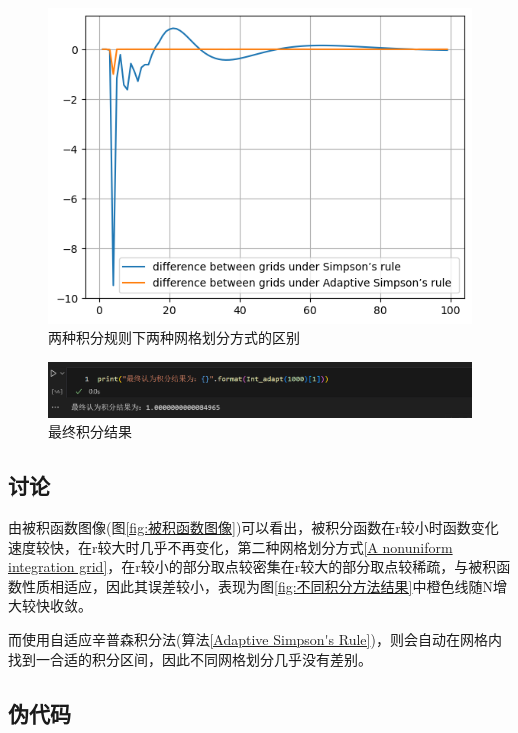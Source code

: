 \documentclass[11pt]{article}
\begin{document}
\begin{figure}[H]
    \centering
    \includegraphics[width=0.5\linewidth]{两种积分规则下两种网格划分方式的区别.png}
    \caption{两种积分规则下两种网格划分方式的区别}
    \label{fig:两种积分规则下两种网格划分方式的区别}
\end{figure}

\begin{figure}[H]
    \centering
    \includegraphics[width=0.5\linewidth]{最终积分结果.png}
    \caption{最终积分结果}
    \label{fig:最终积分结果}
\end{figure}

\subsection{讨论}
由被积函数图像(图\ref{fig:被积函数图像})可以看出，被积分函数在r较小时函数变化速度较快，在r较大时几乎不再变化，第二种网格划分方式\ref{A nonuniform integration grid}，在r较小的部分取点较密集在r较大的部分取点较稀疏，与被积函数性质相适应，因此其误差较小，表现为图\ref{fig:不同积分方法结果}中橙色线随N增大较快收敛。

而使用自适应辛普森积分法(算法\ref{Adaptive Simpson's Rule})，则会自动在网格内找到一合适的积分区间，因此不同网格划分几乎没有差别。

\subsection{伪代码}
\end{document}
